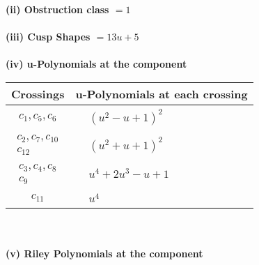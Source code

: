 \documentclass[1p]{elsarticle_modified}
\theoremstyle{definition}
\begin{document}
\flushleft \textbf{(ii) Obstruction class $= 1$}\\~\\
\flushleft \textbf{(iii) Cusp Shapes $= 13 u+5$}\\~\\
\newpage\renewcommand{\arraystretch}{1}
\flushleft \textbf{(iv) u-Polynomials at the component}\newline \\
\begin{tabular}{m{50pt}|m{274pt}}
Crossings & \hspace{64pt}u-Polynomials at each crossing \\
\hline $$\begin{aligned}c_{1},c_{5},c_{6}\end{aligned}$$&$\begin{aligned}
&(u^2- u+1)^2
\end{aligned}$\\
\hline $$\begin{aligned}c_{2},c_{7},c_{10}\\c_{12}\end{aligned}$$&$\begin{aligned}
&(u^2+u+1)^2
\end{aligned}$\\
\hline $$\begin{aligned}c_{3},c_{4},c_{8}\\c_{9}\end{aligned}$$&$\begin{aligned}
&u^4+2 u^3- u+1
\end{aligned}$\\
\hline $$\begin{aligned}c_{11}\end{aligned}$$&$\begin{aligned}
&u^4
\end{aligned}$\\
\hline
\end{tabular}\\~\\
\newpage\renewcommand{\arraystretch}{1}
\flushleft \textbf{(v) Riley Polynomials at the component}\newline \\
\end{document}
